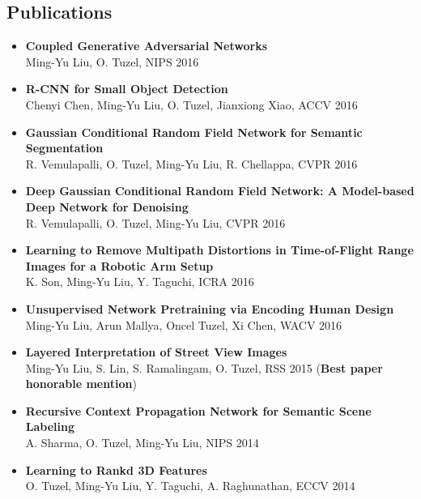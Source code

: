 \documentclass[10pt,letterpaper]{article}
\begin{document}
\subsection*{Publications}
\begin{itemize}
\item {\bf Coupled Generative Adversarial Networks}\\
      Ming-Yu Liu, O. Tuzel, NIPS 2016\vspace{-2mm}
\item {\bf R-CNN for Small Object Detection}\\
      Chenyi Chen, Ming-Yu Liu, O. Tuzel, Jianxiong Xiao, ACCV 2016\vspace{-2mm}      
\item {\bf Gaussian Conditional Random Field Network for Semantic Segmentation}\\
      R. Vemulapalli, O. Tuzel, Ming-Yu Liu, R. Chellappa, CVPR 2016\vspace{-2mm}
\item {\bf Deep Gaussian Conditional Random Field Network: A Model-based Deep Network for Denoising}\\
      R. Vemulapalli, O. Tuzel, Ming-Yu Liu, CVPR 2016\vspace{-2mm}
\item {\bf Learning to Remove Multipath Distortions in Time-of-Flight Range Images for a Robotic Arm Setup}\\
      K. Son, Ming-Yu Liu, Y. Taguchi, ICRA 2016\vspace{-2mm}
\item {\bf Unsupervised Network Pretraining via Encoding Human Design}\\
      Ming-Yu Liu, Arun Mallya, Oncel Tuzel, Xi Chen, WACV 2016\vspace{-2mm}
\item {\bf Layered Interpretation of Street View Images}\\
      Ming-Yu Liu, S. Lin, S. Ramalingam, O. Tuzel, RSS 2015 ({\bf Best paper honorable mention})\vspace{-2mm}
\item {\bf Recursive Context Propagation Network for Semantic Scene Labeling}\\
			A. Sharma, O. Tuzel, {Ming-Yu Liu}, {NIPS} 2014\vspace{-2mm}
\item {\bf Learning to Rankd 3D Features}\\
			O. Tuzel, {Ming-Yu Liu}, Y. Taguchi, A. Raghunathan, {ECCV} 2014\vspace{-2mm}

\end{itemize}
\end{document}
